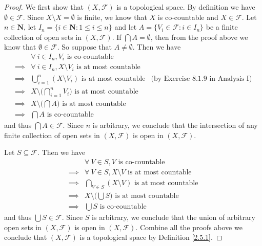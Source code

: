 \begin{proof}
    We first show that \((X, \mathcal{F})\) is a topological space.
    By definition we have \(\emptyset \in \mathcal{F}\).
    Since \(X \setminus X = \emptyset\) is finite, we know that \(X\) is co-countable and \(X \in \mathcal{F}\).
    Let \(n \in \mathbf{N}\), let \(I_n = \{i \in \mathbf{N} : 1 \leq i \leq n\}\) and let \(A = \{V_i \in \mathcal{F} : i \in I_n\}\) be a finite collection of open sets in \((X, \mathcal{F})\).
    If \(\bigcap A = \emptyset\), then from the proof above we know that \(\emptyset \in \mathcal{F}\).
    So suppose that \(A \neq \emptyset\).
    Then we have
    \begin{align*}
                 & \forall\ i \in I_n, V_i \text{ is co-countable}                                                                       \\
        \implies & \forall\ i \in I_n, X \setminus V_i \text{ is at most countable}                                                      \\
        \implies & \bigcup_{i = 1}^n (X \setminus V_i) \text{ is at most countable}           & \text{(by Exercise 8.1.9 in Analysis I)} \\
        \implies & X \setminus \bigg(\bigcap_{i = 1}^n V_i\bigg) \text{ is at most countable}                                            \\
        \implies & X \setminus \bigg(\bigcap A\bigg) \text{ is at most countable}                                                        \\
        \implies & \bigcap A \text{ is co-countable}
    \end{align*}
    and thus \(\bigcap A \in \mathcal{F}\).
    Since \(n\) is arbitrary, we conclude that the intersection of any finite collection of open sets in \((X, \mathcal{F})\) is open in \((X, \mathcal{F})\).

    Let \(S \subseteq \mathcal{F}\).
    Then we have
    \begin{align*}
                 & \forall\ V \in S, V \text{ is co-countable}                    \\
        \implies & \forall\ V \in S, X \setminus V \text{ is at most countable}   \\
        \implies & \bigcap_{V \in S} (X \setminus V) \text{ is at most countable} \\
        \implies & X \setminus \bigg(\bigcup S\bigg) \text{ is at most countable} \\
        \implies & \bigcup S \text{ is co-countable}
    \end{align*}
    and thus \(\bigcup S \in \mathcal{F}\).
    Since \(S\) is arbitrary, we conclude that the union of arbitrary open sets in \((X, \mathcal{F})\) is open in \((X, \mathcal{F})\).
    Combine all the proofs above we conclude that \((X, \mathcal{F})\) is a topological space by Definition \ref{2.5.1}.


\end{proof}
